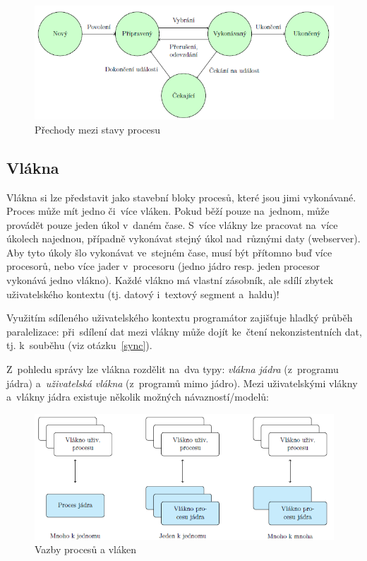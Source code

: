 \begin{figure}
	\centering
	\includegraphics[scale=1]{images/proc_states.png}
	\caption{Přechody mezi stavy procesu}
	\label{proc_states}
\end{figure}

\subsection{Vlákna}

Vlákna si lze představit jako stavební bloky procesů, které jsou jimi vykonávané. Proces může mít jedno či~více vláken. Pokud běží pouze na~jednom, může provádět pouze jeden úkol v~daném čase. S~více vlákny lze pracovat na~více úkolech najednou, případně vykonávat stejný úkol nad~různými daty (webserver). Aby tyto úkoly šlo vykonávat ve~stejném čase, musí být přítomno buď více procesorů, nebo více jader v~procesoru (jedno jádro resp. jeden procesor vykonává jedno vlákno). Každé vlákno má vlastní zásobník, ale sdílí zbytek uživatelského kontextu (tj. datový i~textový segment a~haldu)!

Využitím sdíleného uživatelského kontextu programátor zajišťuje hladký průběh paralelizace: při~sdílení dat mezi vlákny může dojít ke~čtení nekonzistentních dat, tj. k~souběhu (viz otázku~\ref{sync}).

Z~pohledu správy lze vlákna rozdělit na~dva typy: \emph{vlákna jádra} (z~programu jádra) a~\emph{uživatelská vlákna} (z~programů mimo jádro). Mezi uživatelskými vlákny a~vlákny jádra existuje několik možných návazností/modelů:

\begin{figure}[ht]
	\centering
	\includegraphics[scale=1]{images/thread_models.png}
	\caption{Vazby procesů a vláken}
	\label{thread_models}
\end{figure}

